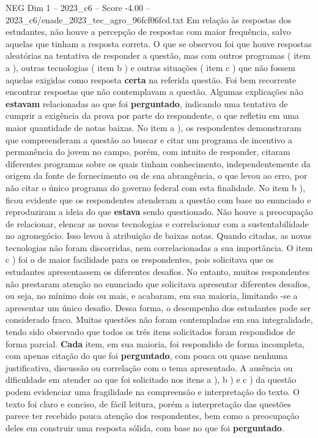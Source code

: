 \begin{textsample}{NEG Dim 1 – 2023\_c6 – Score -4.00 – 2023\_c6/enade\_2023\_tec\_agro\_96fcf06fcd.txt}
Em relação às respostas dos estudantes, não houve a percepção de respostas com maior frequência, salvo aquelas que tinham a resposta correta.
O que se observou foi que houve respostas aleatórias na tentativa de responder a questão, mas com outros programas ( item a ), outras tecnologias ( item b ) e outras situações ( item c ) que não fossem aquelas exigidas como resposta \textbf{certa} na referida questão.
Foi bem recorrente encontrar respostas que não contemplavam a questão.
Algumas explicações não \textbf{estavam} relacionadas ao que foi \textbf{perguntado}, indicando uma tentativa de cumprir a exigência da prova por parte do respondente, o que refletiu em uma maior quantidade de notas baixas.
No item a ), os respondentes demonstraram que compreenderam a questão ao buscar e citar um programa de incentivo a permanência do jovem no campo, porém, com intuito de responder, citaram diferentes programas sobre os quais tinham conhecimento, independentemente da origem da fonte de fornecimento ou de sua abrangência, o que levou ao erro, por não citar o único programa do governo federal com esta finalidade.
No item b ), ficou evidente que os respondentes atenderam a questão com base no enunciado e reproduziram a ideia do que \textbf{estava} sendo questionado.
Não houve a preocupação de relacionar, elencar as novas tecnologias e correlacionar com a sustentabilidade no agronegócio.
Isso levou à atribuição de baixas notas.
Quando citadas, as novas tecnologias não foram discorridas, nem correlacionadas a sua importância.
O item c ) foi o de maior facilidade para os respondentes, pois solicitava que os estudantes apresentassem os diferentes desafios.
No entanto, muitos respondentes não prestaram atenção no enunciado que solicitava apresentar diferentes desafios, ou seja, no mínimo dois ou mais, e acabaram, em sua maioria, limitando -se a apresentar um único desafio.
Dessa forma, o desempenho dos estudantes pode ser considerado fraco.
Muitas questões não foram contempladas em sua integralidade, tendo sido observado que todos os três itens solicitados foram respondidos de forma parcial. \textbf{Cada} item, em sua maioria, foi respondido de forma incompleta, com apenas citação do que foi \textbf{perguntado}, com pouca ou quase nenhuma justificativa, discussão ou correlação com o tema apresentado.
A ausência ou dificuldade em atender ao que foi solicitado nos itens a ), b ) e c ) da questão podem evidenciar uma fragilidade na compreensão e interpretação do texto.
O texto foi claro e conciso, de fácil leitura, porém a interpretação das questões parece ter recebido pouca atenção dos respondentes, bem como a preocupação deles em construir uma resposta sólida, com base no que foi \textbf{perguntado}.

\end{textsample}
